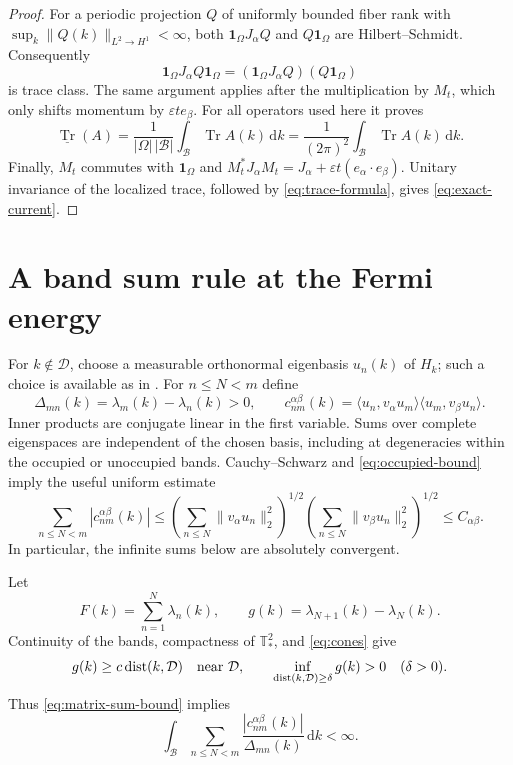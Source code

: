 \documentclass[11pt,a4paper]{article}
\numberwithin{equation}{section}
\newcommand{\T}{\mathbb T}
\newcommand{\one}{\mathbf 1}
\newcommand{\cB}{\mathcal B}
\newcommand{\cD}{\mathcal D}
\newcommand{\trv}{\underline{\operatorname{Tr}}}
\newcommand{\dd}{\,\mathrm d}
\DeclareMathOperator{\Tr}{Tr}
\DeclareMathOperator{\dist}{dist}
\theoremstyle{remark}
\begin{document}
\begin{proof}
For a periodic projection $Q$ of uniformly bounded fiber rank with
$\sup_k\|Q(k)\|_{L^2\to H^1}<\infty$, both $\one_\Omega J_\alpha Q$ and
$Q\one_\Omega$ are Hilbert--Schmidt. Consequently
\[
 \one_\Omega J_\alpha Q\one_\Omega
     =(\one_\Omega J_\alpha Q)(Q\one_\Omega)
\]
is trace class. The same argument applies after the multiplication by
$M_t$, which only shifts momentum by $\varepsilon t e_\beta$.
For all operators used here it proves
\begin{equation}\label{eq:trace-formula}
 \trv(A)=\frac1{|\Omega|\,|\cB|}
             \int_{\cB}\Tr A(k)\dd k
          =\frac1{(2\pi)^2}\int_{\cB}\Tr A(k)\dd k.
\end{equation}
Finally, $M_t$ commutes with $\one_\Omega$ and
$M_t^*J_\alpha M_t=J_\alpha+\varepsilon t(e_\alpha\cdot e_\beta)$.
Unitary invariance of the localized trace, followed by
\eqref{eq:trace-formula}, gives \eqref{eq:exact-current}.
\end{proof}

\section{A band sum rule at the Fermi energy}

For $k\notin\cD$, choose a measurable orthonormal eigenbasis $u_n(k)$
of $H_k$; such a choice is available as in
\cite[Theorem XIII.98]{RS4}.
For $n\leq N<m$ define
\begin{equation}\label{eq:matrix-elements}
 \Delta_{mn}(k)=\lambda_m(k)-\lambda_n(k)>0,\qquad
 c_{nm}^{\alpha\beta}(k)
   =\langle u_n,v_\alpha u_m\rangle
      \langle u_m,v_\beta u_n\rangle.
\end{equation}
Inner products are conjugate linear in the first variable. Sums over
complete eigenspaces are independent of the chosen basis, including at
degeneracies within the occupied or unoccupied bands. Cauchy--Schwarz
and \eqref{eq:occupied-bound} imply the useful uniform estimate
\begin{equation}\label{eq:matrix-sum-bound}
 \sum_{n\leq N<m}|c_{nm}^{\alpha\beta}(k)|
 \leq
 \left(\sum_{n\leq N}\|v_\alpha u_n\|_2^2\right)^{1/2}
 \left(\sum_{n\leq N}\|v_\beta u_n\|_2^2\right)^{1/2}
 \leq C_{\alpha\beta}.
\end{equation}
In particular, the infinite sums below are absolutely convergent.

Let
\begin{equation}\label{eq:filled-energy}
 F(k)=\sum_{n=1}^N\lambda_n(k),\qquad
 g(k)=\lambda_{N+1}(k)-\lambda_N(k).
\end{equation}
Continuity of the bands, compactness of $\T_*^2$, and
\eqref{eq:cones} give
\begin{equation}\label{eq:gap-lower}
 g(k)\geq c\dist(k,\cD)\quad\hbox{near }\cD,
 \qquad \inf_{\dist(k,\cD)\geq\delta}g(k)>0\quad(\delta>0).
\end{equation}
Thus \eqref{eq:matrix-sum-bound} implies
\begin{equation}\label{eq:integrable-sum}
 \int_{\cB}\sum_{n\leq N<m}
       \frac{|c_{nm}^{\alpha\beta}(k)|}{\Delta_{mn}(k)}\dd k<\infty.
\end{equation}
\end{document}
